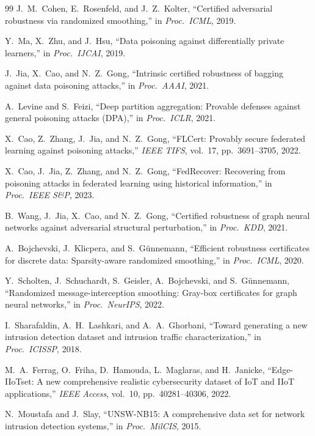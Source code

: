 \documentclass[12pt,a4paper]{article}
\theoremstyle{definition}
\theoremstyle{remark}
\begin{document}
\begin{thebibliography}{99}
J.~M.~Cohen, E.~Rosenfeld, and J.~Z.~Kolter, ``Certified adversarial robustness via randomized smoothing,'' in \emph{Proc.\ ICML}, 2019.

Y.~Ma, X.~Zhu, and J.~Hsu, ``Data poisoning against differentially private learners,'' in \emph{Proc.\ IJCAI}, 2019.

J.~Jia, X.~Cao, and N.~Z.~Gong, ``Intrinsic certified robustness of bagging against data poisoning attacks,'' in \emph{Proc.\ AAAI}, 2021.

A.~Levine and S.~Feizi, ``Deep partition aggregation: Provable defenses against general poisoning attacks ({DPA}),'' in \emph{Proc.\ ICLR}, 2021.

X.~Cao, Z.~Zhang, J.~Jia, and N.~Z.~Gong, ``{FLCert}: Provably secure federated learning against poisoning attacks,'' \emph{IEEE TIFS}, vol.~17, pp.~3691--3705, 2022.

X.~Cao, J.~Jia, Z.~Zhang, and N.~Z.~Gong, ``{FedRecover}: Recovering from poisoning attacks in federated learning using historical information,'' in \emph{Proc.\ IEEE S\&P}, 2023.

B.~Wang, J.~Jia, X.~Cao, and N.~Z.~Gong, ``Certified robustness of graph neural networks against adversarial structural perturbation,'' in \emph{Proc.\ KDD}, 2021.

A.~Bojchevski, J.~Klicpera, and S.~G\"unnemann, ``Efficient robustness certificates for discrete data: Sparsity-aware randomized smoothing,'' in \emph{Proc.\ ICML}, 2020.

Y.~Scholten, J.~Schuchardt, S.~Geisler, A.~Bojchevski, and S.~G\"unnemann, ``Randomized message-interception smoothing: Gray-box certificates for graph neural networks,'' in \emph{Proc.\ NeurIPS}, 2022.

I.~Sharafaldin, A.~H.~Lashkari, and A.~A.~Ghorbani, ``Toward generating a new intrusion detection dataset and intrusion traffic characterization,'' in \emph{Proc.\ ICISSP}, 2018.

M.~A.~Ferrag, O.~Friha, D.~Hamouda, L.~Maglaras, and H.~Janicke, ``{Edge-IIoTset}: A new comprehensive realistic cybersecurity dataset of {IoT} and {IIoT} applications,'' \emph{IEEE Access}, vol.~10, pp.~40281--40306, 2022.

N.~Moustafa and J.~Slay, ``{UNSW-NB15}: A comprehensive data set for network intrusion detection systems,'' in \emph{Proc.\ MilCIS}, 2015.


\end{thebibliography}
\end{document}
